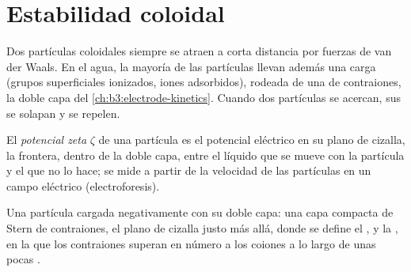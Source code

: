 \section{Estabilidad coloidal}

Dos partículas coloidales siempre se atraen a corta distancia por fuerzas de van der
Waals. En el agua, la mayoría de las partículas llevan además una carga (grupos superficiales
ionizados, iones adsorbidos), rodeada de una  de contraiones, la doble
capa del \cref{ch:b3:electrode-kinetics}. Cuando dos partículas se acercan, sus
 se solapan y se repelen.

\begin{definition}\label{def:b3:colloids:zeta}
El \emph{potencial zeta} $\zeta$ de una partícula es el potencial
eléctrico en su plano de cizalla, la frontera, dentro de la doble capa, entre
el líquido que se mueve con la partícula y el que no lo hace; se
mide a partir de la velocidad de las partículas en un campo eléctrico
(electroforesis).
\end{definition}

\begin{omfigure}

{\small Una partícula cargada negativamente con su doble capa: una capa compacta de Stern
de contraiones, el plano de cizalla justo más allá, donde se define el , y la , en la que los contraiones superan en número a los
coiones a lo largo de unas pocas .}
\end{omfigure}

